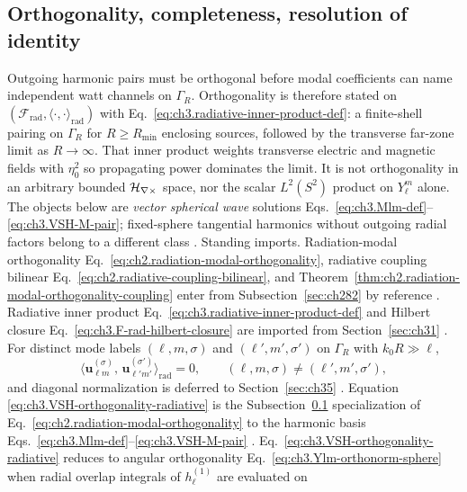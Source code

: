 \subsection{Orthogonality, completeness, resolution of identity}
\label{sec:ch343}
Outgoing harmonic pairs must be orthogonal before modal coefficients can name independent watt channels on $\Gamma_R$.
Orthogonality is therefore stated on $(\mathcal{F}_{\mathrm{rad}},\langle\cdot,\cdot\rangle_{\mathrm{rad}})$
with Eq.~\eqref{eq:ch3.radiative-inner-product-def}: a finite-shell pairing on $\Gamma_R$ for $R\ge R_{\min}$
enclosing sources, followed by the transverse far-zone limit as $R\to\infty$.
That inner product weights transverse electric and magnetic fields with $\eta_0^{2}$ so propagating power dominates the limit.
It is not orthogonality in an arbitrary bounded $\mathcal{H}_{\nabla\times}$ space, nor the scalar $L^{2}(S^{2})$ product on $Y_{\ell}^{m}$ alone.
The objects below are \emph{vector spherical wave} solutions Eqs.~\eqref{eq:ch3.Mlm-def}--\eqref{eq:ch3.VSH-M-pair};
fixed-sphere tangential harmonics without outgoing radial factors belong to a different class \cite{stratton1941,hansen1988}.
Standing imports. Radiation-modal orthogonality Eq.~\eqref{eq:ch2.radiation-modal-orthogonality}, radiative coupling bilinear
Eq.~\eqref{eq:ch2.radiative-coupling-bilinear}, and Theorem~\ref{thm:ch2.radiation-modal-orthogonality-coupling}
enter from Subsection~\ref{sec:ch282} by reference \cite{stratton1941}. Radiative inner product
Eq.~\eqref{eq:ch3.radiative-inner-product-def} and Hilbert closure Eq.~\eqref{eq:ch3.F-rad-hilbert-closure} are
imported from Section~\ref{sec:ch31} \cite{hansen1988}.
For distinct mode labels \((\ell,m,\sigma)\) and \((\ell',m',\sigma')\) on \(\Gamma_{R}\) with \(k_{0}R\gg\ell\),
\begin{equation}
\label{eq:ch3.VSH-orthogonality-radiative}
\langle \mathbf{u}_{\ell m}^{(\sigma)},\,\mathbf{u}_{\ell' m'}^{(\sigma')}\rangle_{\mathrm{rad}}
=
0,
\qquad
(\ell,m,\sigma)\neq(\ell',m',\sigma'),
\end{equation}
and diagonal normalization is deferred to Section~\ref{sec:ch35} \cite{stratton1941}. Equation
\eqref{eq:ch3.VSH-orthogonality-radiative} is the Subsection~\ref{sec:ch343} specialization of
Eq.~\eqref{eq:ch2.radiation-modal-orthogonality} to the harmonic basis
Eqs.~\eqref{eq:ch3.Mlm-def}--\eqref{eq:ch3.VSH-M-pair} \cite{harrington2001}.
Eq.~\eqref{eq:ch3.VSH-orthogonality-radiative} reduces to angular orthogonality
Eq.~\eqref{eq:ch3.Ylm-orthonorm-sphere} when radial overlap integrals of \(h_{\ell}^{(1)}\) are evaluated on
